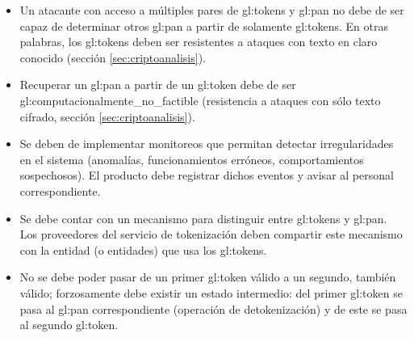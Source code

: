 \begin{itemize}

  \item Un atacante con acceso a múltiples pares de \glspl{gl:token} y
    \gls{gl:pan} no debe de ser capaz de determinar otros \gls{gl:pan} a partir
    de solamente \glspl{gl:token}. En otras palabras, los \glspl{gl:token}
    deben ser resistentes a ataques con texto en claro conocido (sección
    \ref{sec:criptoanalisis}).

  \item Recuperar un \gls{gl:pan} a partir de un \gls{gl:token} debe de ser
    \gls{gl:computacionalmente_no_factible} (resistencia a ataques con sólo
    texto cifrado, sección \ref{sec:criptoanalisis}).

  \item Se deben de implementar monitoreos que permitan detectar
     irregularidades en el sistema (anomalías, funcionamientos erróneos,
     comportamientos sospechosos). El producto debe registrar dichos eventos y
     avisar al personal correspondiente.

  \item Se debe contar con un mecanismo para distinguir entre \glspl{gl:token}
    y \gls{gl:pan}. Los proveedores del servicio de tokenización deben
    compartir este mecanismo con la entidad (o entidades) que usa los
    \glspl{gl:token}.


  \item No se debe poder pasar de un primer \gls{gl:token} válido a un segundo,
    también válido; forzosamente debe existir un estado intermedio: del primer
    \gls{gl:token} se pasa al \gls{gl:pan} correspondiente (operación de
    detokenización) y de este se pasa al segundo \gls{gl:token}.


\end{itemize}
